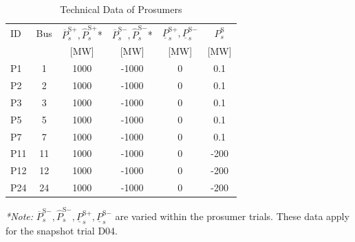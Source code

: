 \documentclass[lettersize,journal]{IEEEtran}
\newcommand{\ts}{\text}
\begin{document}
\begin{table}[H]
    \centering
    \caption{Technical Data of Prosumers}
    \label{tab:prosumer_technical_data}
    \begin{tabularx}{\columnwidth}{>{\centering\arraybackslash}X c c c c c}
        \toprule
        ID & Bus & $\overline{P}_s^{\ts{S}+}, \hat{P}_s^{\ts{S}+}$*   & $\overline{P}_s^{\ts{S}-}, \hat{P}_s^{\ts{S}-}$* & $\underline{P}_s^{\ts{S}+}, \underline{P}_s^{\ts{S}-}$ & $P_s^{\ts{S}}$\\
            &     &[MW]                                              & [MW]                                            & [MW]                                                   & [MW]\\
        \midrule
        P1   & 1  &  1000 &  -1000 & 0 & 0.1\\
        P2   & 2  &  1000 &  -1000 & 0 & 0.1\\
        P3   & 3  &  1000 &  -1000 & 0 & 0.1\\
        P5   & 5  &  1000 &  -1000 & 0 & 0.1\\
        P7   & 7  &  1000 &  -1000 & 0 & 0.1\\
        P11  & 11 &  1000 &  -1000 & 0 & -200\\
        P12  & 12 &  1000 &  -1000 & 0 & -200\\
        P24  & 24 &  1000 &  -1000 & 0 & -200\\
        \bottomrule
    \end{tabularx}
  \begin{minipage}{\columnwidth}
    \vspace{0.1cm}
    \footnotesize \textit{*Note:}  $\overline{P}_s^{\ts{S}-}, \hat{P}_s^{\ts{S}-}, \underline{P}_s^{\ts{S}+}, \underline{P}_s^{\ts{S}-}$ are varied within the prosumer trials.
    These data apply for the snapshot trial D04.
  \end{minipage}
\end{table}


\end{document}
